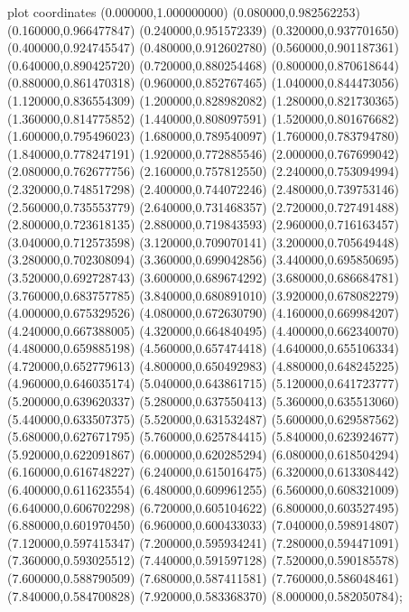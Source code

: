  plot coordinates {(0.000000,1.000000000) (0.080000,0.982562253) (0.160000,0.966477847) (0.240000,0.951572339) (0.320000,0.937701650) (0.400000,0.924745547) (0.480000,0.912602780) (0.560000,0.901187361) (0.640000,0.890425720) (0.720000,0.880254468) (0.800000,0.870618644) (0.880000,0.861470318) (0.960000,0.852767465) (1.040000,0.844473056) (1.120000,0.836554309) (1.200000,0.828982082) (1.280000,0.821730365) (1.360000,0.814775852) (1.440000,0.808097591) (1.520000,0.801676682) (1.600000,0.795496023) (1.680000,0.789540097) (1.760000,0.783794780) (1.840000,0.778247191) (1.920000,0.772885546) (2.000000,0.767699042) (2.080000,0.762677756) (2.160000,0.757812550) (2.240000,0.753094994) (2.320000,0.748517298) (2.400000,0.744072246) (2.480000,0.739753146) (2.560000,0.735553779) (2.640000,0.731468357) (2.720000,0.727491488) (2.800000,0.723618135) (2.880000,0.719843593) (2.960000,0.716163457) (3.040000,0.712573598) (3.120000,0.709070141) (3.200000,0.705649448) (3.280000,0.702308094) (3.360000,0.699042856) (3.440000,0.695850695) (3.520000,0.692728743) (3.600000,0.689674292) (3.680000,0.686684781) (3.760000,0.683757785) (3.840000,0.680891010) (3.920000,0.678082279) (4.000000,0.675329526) (4.080000,0.672630790) (4.160000,0.669984207) (4.240000,0.667388005) (4.320000,0.664840495) (4.400000,0.662340070) (4.480000,0.659885198) (4.560000,0.657474418) (4.640000,0.655106334) (4.720000,0.652779613) (4.800000,0.650492983) (4.880000,0.648245225) (4.960000,0.646035174) (5.040000,0.643861715) (5.120000,0.641723777) (5.200000,0.639620337) (5.280000,0.637550413) (5.360000,0.635513060) (5.440000,0.633507375) (5.520000,0.631532487) (5.600000,0.629587562) (5.680000,0.627671795) (5.760000,0.625784415) (5.840000,0.623924677) (5.920000,0.622091867) (6.000000,0.620285294) (6.080000,0.618504294) (6.160000,0.616748227) (6.240000,0.615016475) (6.320000,0.613308442) (6.400000,0.611623554) (6.480000,0.609961255) (6.560000,0.608321009) (6.640000,0.606702298) (6.720000,0.605104622) (6.800000,0.603527495) (6.880000,0.601970450) (6.960000,0.600433033) (7.040000,0.598914807) (7.120000,0.597415347) (7.200000,0.595934241) (7.280000,0.594471091) (7.360000,0.593025512) (7.440000,0.591597128) (7.520000,0.590185578) (7.600000,0.588790509) (7.680000,0.587411581) (7.760000,0.586048461) (7.840000,0.584700828) (7.920000,0.583368370) (8.000000,0.582050784)};
